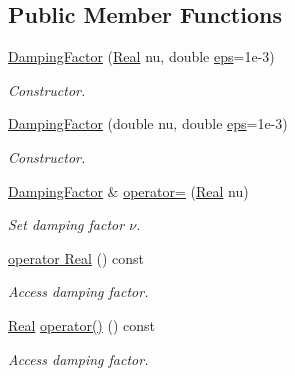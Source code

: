 \subsection*{Public Member Functions}
\begin{DoxyCompactItemize}
\item 
\hyperlink{classSpacy_1_1DampingFactor_a03128fa4d2d17bd2024eaaff5a6cf03a_a03128fa4d2d17bd2024eaaff5a6cf03a}{Damping\+Factor} (\hyperlink{classSpacy_1_1Real}{Real} nu, double \hyperlink{classSpacy_1_1Mixin_1_1Eps_a40e2ba8f3abd2b5370ef41238cfaaf8b_a40e2ba8f3abd2b5370ef41238cfaaf8b}{eps}=1e-\/3)
\begin{DoxyCompactList}\small\item\em Constructor. \end{DoxyCompactList}\item 
\hyperlink{classSpacy_1_1DampingFactor_a9e94f7d54ef502b804da36bde0ced9fe_a9e94f7d54ef502b804da36bde0ced9fe}{Damping\+Factor} (double nu, double \hyperlink{classSpacy_1_1Mixin_1_1Eps_a40e2ba8f3abd2b5370ef41238cfaaf8b_a40e2ba8f3abd2b5370ef41238cfaaf8b}{eps}=1e-\/3)
\begin{DoxyCompactList}\small\item\em Constructor. \end{DoxyCompactList}\item 
\hyperlink{classSpacy_1_1DampingFactor}{Damping\+Factor} \& \hyperlink{classSpacy_1_1DampingFactor_a214beda25cc00fbe6c953308ba1ca9b3_a214beda25cc00fbe6c953308ba1ca9b3}{operator=} (\hyperlink{classSpacy_1_1Real}{Real} nu)
\begin{DoxyCompactList}\small\item\em Set damping factor $\nu$. \end{DoxyCompactList}\item 
\hyperlink{classSpacy_1_1DampingFactor_ab2f626689cc8907bd9da2635e0bbd572_ab2f626689cc8907bd9da2635e0bbd572}{operator Real} () const 
\begin{DoxyCompactList}\small\item\em Access damping factor. \end{DoxyCompactList}\item 
\hyperlink{classSpacy_1_1Real}{Real} \hyperlink{classSpacy_1_1DampingFactor_aa14911dc85380f66fdb3541935cf893c_aa14911dc85380f66fdb3541935cf893c}{operator()} () const 
\begin{DoxyCompactList}\small\item\em Access damping factor. \end{DoxyCompactList}\item 

\end{DoxyCompactItemize}
